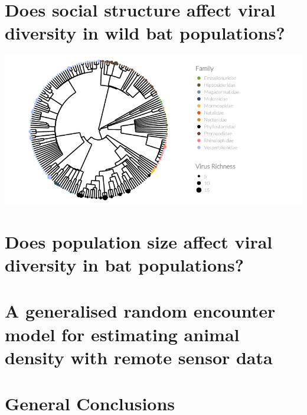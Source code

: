 \documentclass[11pt,phd,a4paper,twoside]{PrettyStanley}
\begin{document}
\chapter[Social structure in wild populations]{Does social structure affect viral diversity in wild bat populations?}
\label{chapterlabel3}
\begin{center}
\includegraphics[width=\textwidth]{figure/treePlot-1.pdf}
\end{center}


\chapter[Population Size]{Does population size affect viral diversity in bat populations?}
\label{chapterlabel4}



\chapter[gREM for estimating animal density]{A generalised random encounter model for estimating animal density with remote sensor data}
\label{chapterlabel5}


\chapter{General Conclusions}
\label{conclusions}




 


%
\printbibliography 


\end{document}
